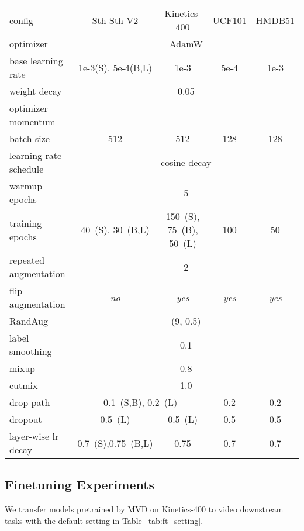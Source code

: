 \documentclass[10pt,twocolumn,letterpaper]{article}
\begin{document}
\begin{table*}[h]
\centering
\begin{tabular}{l|cccc}
config & Sth-Sth V2 & Kinetics-400 & UCF101 & HMDB51 \\
\shline
optimizer & \multicolumn{4}{c}{AdamW} \\
base learning rate & 1e-3(S), 5e-4(B,L) & 1e-3 & 5e-4 & 1e-3 \\
weight decay & \multicolumn{4}{c}{0.05} \\
optimizer momentum & \multicolumn{4}{c}{} \\
batch size & 512 & 512 & 128 & 128\\
learning rate schedule & \multicolumn{4}{c}{cosine decay} \\
warmup epochs & \multicolumn{4}{c}{5} \\
training epochs &  40~(S), 30~(B,L) & 150~(S), 75~(B), 50~(L) & 100 & 50 \\
repeated augmentation & \multicolumn{4}{c}{2}  \\
flip augmentation & \emph{no} & \emph{yes} & \emph{yes} & \emph{yes} \\
RandAug~\cite{cubuk2020randaugment}  & \multicolumn{4}{c}{(9, 0.5)} \\
label smoothing~\cite{label_smoothing}  & \multicolumn{4}{c}{0.1} \\
mixup~\cite{zhang2017mixup}  & \multicolumn{4}{c}{0.8}  \\
cutmix~\cite{yun2019cutmix}  & \multicolumn{4}{c}{1.0} \\
drop path~\cite{droppath} & \multicolumn{2}{c}{0.1~(S,B), 0.2~(L)} & 0.2 & 0.2 \\
dropout~\cite{hinton2012improving_dropout} & 0.5~(L) & 0.5~(L) & 0.5 & 0.5 \\
layer-wise lr decay~\cite{bao2021beit}  & 0.7~(S),0.75~(B,L) & 0.75 & 0.7 & 0.7 \\
\end{tabular}
\caption{\textbf{Fine-tuning setting of MVD.}}
\label{tab:ft_setting}
\end{table*}




\subsection{Finetuning Experiments}

We transfer models pretrained by MVD on Kinetics-400 to video downstream tasks with the default setting in Table~\ref{tab:ft_setting}.
\end{document}
